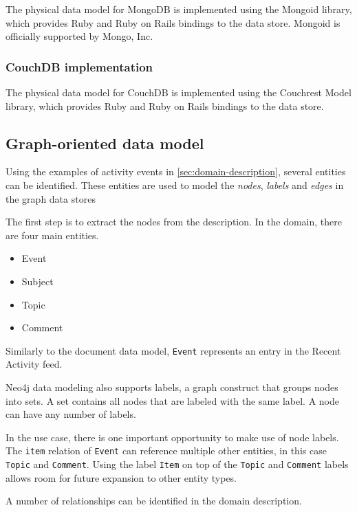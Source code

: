 The physical data model for MongoDB is implemented using the Mongoid library, which provides Ruby and Ruby on Rails bindings to the data store.
Mongoid is officially supported by Mongo, Inc.

\subsubsection{CouchDB implementation}
\label{subsubsec:couchdb-implementation}

The physical data model for CouchDB is implemented using the Couchrest Model library, which provides Ruby and Ruby on Rails bindings to the data store.

\subsection{Graph-oriented data model}
\label{subsec:graph-data-model}

Using the examples of activity events in \cref{sec:domain-description}, several entities can be identified.
These entities are used to model the \textit{nodes}, \textit{labels} and \textit{edges} in the graph data stores

The first step is to extract the nodes from the description.
In the domain, there are four main entities.

\begin{itemize}
  \item Event
  \item Subject
  \item Topic
  \item Comment
\end{itemize}

Similarly to the document data model, \texttt{Event} represents an entry in the Recent Activity feed.

Neo4j data modeling also supports labels, a graph construct that groups nodes into sets.
A set contains all nodes that are labeled with the same label.
A node can have any number of labels.

In the use case, there is one important opportunity to make use of node labels.
The \texttt{item} relation of \texttt{Event} can reference multiple other entities, in this case \texttt{Topic} and \texttt{Comment}.
Using the label \texttt{Item} on top of the \texttt{Topic} and \texttt{Comment} labels allows room for future expansion to other entity types.

A number of relationships can be identified in the domain description.

